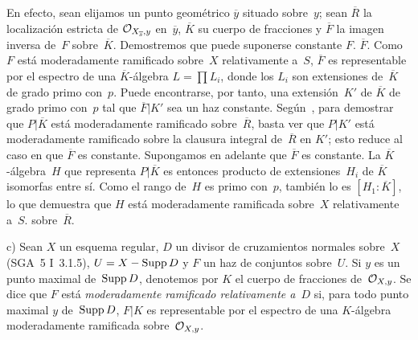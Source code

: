 \begin{remarques}
En efecto,
{sean}
{elijamos un punto geométrico $\overline y$ situado sobre~$y$; sean}
$\overline{R}$ la localización estricta de
$\cal{O}_{X_{\overline{s}},y}$ en~$\overline{y}$, $\overline{K}$ su cuerpo de
fracciones y $\overline{F}$ la imagen inversa de~$F$ sobre~$\overline{K}$.
Demostremos que puede suponerse constante
{$F$.}
{$\overline{F}$.}
Como $F$ está moderadamente ramificado sobre~$X$ relativamente a~$S$,
$\overline{F}$ es representable por el espectro de una $\overline{K}$-álgebra
$L=\prod L_i$, donde los $L_i$ son extensiones de~$\overline{K}$ de grado
primo con~$p$. Puede encontrarse, por tanto, una extensión~$K'$ de
$\overline{K}$ de grado primo con~$p$ tal que $\overline{F}|K'$ sea un haz
constante. Según~, para demostrar que $P|\overline{K}$ está
moderadamente ramificado sobre~$\overline{R}$, basta ver que $P|K'$ está
moderadamente ramificado sobre la clausura integral de~$\overline{R}$ en
$K'$; esto reduce al caso en que $\overline{F}$ es constante. Supongamos en
adelante que $\overline{F}$ es constante. La $\overline{K}$-álgebra~$H$ que
representa $P|\overline{K}$ es entonces producto de extensiones~$H_i$ de
$\overline{K}$ isomorfas entre sí. Como el rango de~$H$ es primo con~$p$,
también lo es $[H_1:\overline{K}]$, lo que demuestra que $H$ está
moderadamente ramificada
{sobre~$X$ relativamente a~$S$.}
{sobre~$\overline{R}$.}

c) Sean $X$ un esquema regular, $D$ un divisor de cruzamientos normales
sobre~$X$ (SGA~5 I~3.1.5), $U=X-\Supp D$ y $F$ un haz de conjuntos sobre~$U$.
Si $y$ es un punto maximal de~$\Supp D$, denotemos por $K$ el cuerpo de
fracciones de~$\cal{O}_{X,y}$. Se dice que $F$ está
\emph{moderadamente ramificado relativamente a}~$D$
%
si, para todo punto maximal $y$ de~$\Supp D$, $F|K$ es representable por el
espectro de una $K$-álgebra moderadamente ramificada sobre~$\cal{O}_{X,y}$.
\end{remarques}
\endgroup
